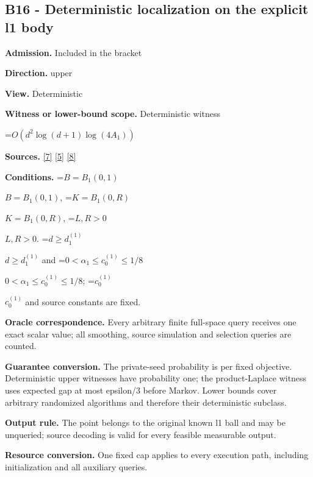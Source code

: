 \documentclass[10pt,a4paper]{article}
\newcommand{\AtlasMath}[1]{\par\begingroup\centering\setbox0=\hbox{$\displaystyle #1$}\ifdim\wd0>1.4\linewidth\typeout{ATLAS WIDE FORMULA: \the\wd0}\fi\ifdim\wd0>\linewidth\resizebox{\linewidth}{!}{\box0}\else\box0\fi\par\endgroup}
\newcommand{\AtlasInlineMath}[1]{\begingroup\setbox0=\hbox{$#1$}\ifdim\wd0>.4\linewidth\endgroup\AtlasMath{#1}\else\endgroup$#1$\fi}
\begin{document}
\subsection{B16 - Deterministic localization on the explicit l1 body}


\textbf{Admission.} Included in the bracket



\textbf{Direction.} upper



\textbf{View.} Deterministic



\textbf{Witness or lower-bound scope.} Deterministic witness



\AtlasMath{O(d^2\log(d+1)\log(4A_1))}


\textbf{Sources.} \href{https://github.com/WU-Wendao/Colombo/blob/main/colombo_sensorium/Complexity_altas/data/sources/colombo/COLOMBO_KIMI_001/kimi_001.pdf}{[7]} \href{https://www.mathnet.ru/php/archive.phtml?jrnid=mzm&option_lang=eng&paperid=1697&wshow=paper}{[5]} \href{https://arxiv.org/pdf/1706.07357}{[8]}



\textbf{Conditions.} \AtlasInlineMath{B=B_1(0,1)}, \AtlasInlineMath{K=B_1(0,R)}, \AtlasInlineMath{L,R>0}. \AtlasInlineMath{d\ge d_1^{(1)}} and \AtlasInlineMath{0<\alpha_1\le c_0^{(1)}\le1/8}; \AtlasInlineMath{c_0^{(1)}} and source constants are fixed.



\textbf{Oracle correspondence.} Every arbitrary finite full-space query receives one exact scalar value; all smoothing, source simulation and selection queries are counted.



\textbf{Guarantee conversion.} The private-seed probability is per fixed objective. Deterministic upper witnesses have probability one; the product-Laplace witness uses expected gap at most epsilon/3 before Markov. Lower bounds cover arbitrary randomized algorithms and therefore their deterministic subclass.



\textbf{Output rule.} The point belongs to the original known l1 ball and may be unqueried; source decoding is valid for every feasible measurable output.



\textbf{Resource conversion.} One fixed cap applies to every execution path, including initialization and all auxiliary queries.
\end{document}
